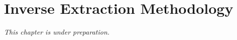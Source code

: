 
\chapter{Inverse Extraction Methodology}
\label{ch:inverse_methodology}

\textit{This chapter is under preparation.}
